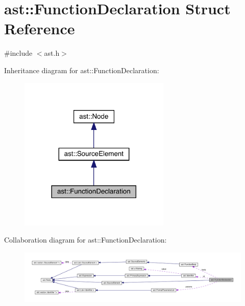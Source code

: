 \hypertarget{structast_1_1_function_declaration}{}\section{ast\+:\+:Function\+Declaration Struct Reference}
\label{structast_1_1_function_declaration}


{\ttfamily \#include $<$ast.\+h$>$}



Inheritance diagram for ast\+:\+:Function\+Declaration\+:\nopagebreak
\begin{figure}[H]
\begin{center}
\leavevmode
\includegraphics[width=204pt]{structast_1_1_function_declaration__inherit__graph}
\end{center}
\end{figure}


Collaboration diagram for ast\+:\+:Function\+Declaration\+:
\nopagebreak
\begin{figure}[H]
\begin{center}
\leavevmode
\includegraphics[width=350pt]{structast_1_1_function_declaration__coll__graph}
\end{center}
\end{figure}

